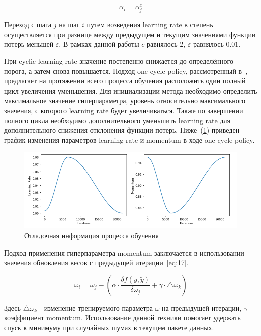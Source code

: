 \begin{equation}
    \label{eq:15}
    \alpha_{i} = \alpha_{j}^{c}
\end{equation}

Переход с шага $j$ на шаг $i$ путем возведения learning rate в степень осуществляется при разнице между предыдущем
и текущим значениями функции потерь меньшей $\varepsilon$.
В рамках данной работы $c$ равнялось 2, $\varepsilon$ равнялось $0.01$.

При cyclic learning rate значение постепенно снижается до определённого порога, а затем снова повышается.
Подход one cycle policy, рассмотренный в~\autocite{smith2018disciplined}, предлагает на протяжении всего процесса обучения расположить один полный цикл увеличения-уменьшения.
Для инициализации метода необходимо определить максимальное значение гиперпараметра, уровень относительно максимального значения, с которого learning rate будет увеличиваться.
Также по завершении полного цикла необходимо дополнительного уменьшить learning rate для дополнительного снижения отклонения функции потерь.
Ниже~(\ref{fig:osp}) приведен график изменения параметров learning rate и momentum в ходе one cycle policy.

\begin{figure}[H]
    \centering
    \includegraphics[width=\textwidth]{img/osp.png}
    \caption{Отладочная информация процесса обучения}
    \label{fig:osp}
\end{figure}

Подход применения гиперпараметра momentum заключается в использовании значения обновления весов с предыдущей итерации~\eqref{eq:17}.

\begin{equation}
    \label{eq:17}
    \omega_{i} = \omega_{j} - (\alpha \cdot \frac{\delta f(y, \tilde{y})}{\delta \omega_{j}} + \gamma \cdot \bigtriangleup \omega_{k})
\end{equation}

Здесь $\bigtriangleup \omega_{k}$ - изменение тренируемого параметра $\omega$ на предыдущей итерации, $\gamma$ - коэффициент momentum.
Использование данной техники помогает удержать спуск к минимуму при случайных шумах в текущем пакете данных.

